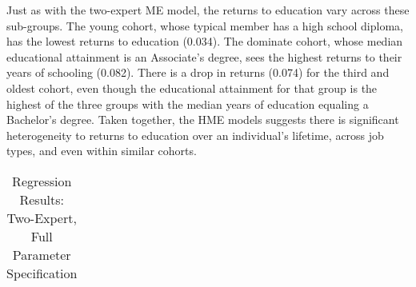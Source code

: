 \documentclass[12pt]{article}
\theoremstyle{definition}
\begin{document}
Just as with the two-expert ME model, the returns to education vary across these sub-groups. The young cohort, whose typical member has a high school diploma, has the lowest returns to education (0.034). The dominate cohort, whose median educational attainment is an Associate's degree, sees the highest returns to their years of schooling (0.082). There is a drop in returns (0.074) for the third and oldest cohort, even though the educational attainment for that group is the highest of the three groups with the median years of education equaling a Bachelor's degree. Taken together, the HME models suggests there is significant heterogeneity to returns to education over an individual's lifetime, across job types, and even within similar cohorts.


\begin{landscape}
  \begin{table} \centering
    \caption{Regression Results: Two-Expert, Full Parameter Specification}
      \begin{threeparttable}
        \tabcolsep=0.11cm
        \begin{tabular}[l]{l r l l r l l c r l c r l l r l l r l l}
  

\end{tabular}
\end{threeparttable}
\end{table}
\end{landscape}
\end{document}
